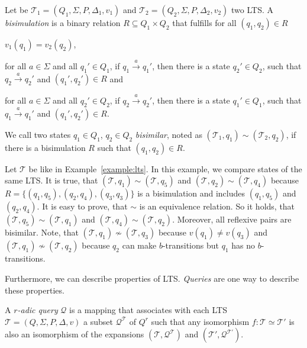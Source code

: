 \begin{definition}
    Let be $\mathcal{T}_1 = (Q_1, \Sigma, P, \Delta_1, v_1)$ and $\mathcal{T}_2 = (Q_2, \Sigma, P, \Delta_2, v_2)
    $ two LTS. A \emph{bisimulation} is a binary relation $R \subseteq Q_1 \times Q_2$ that fulfills for all $(q_1,
    q_2) \in R$
    \begin{compactitem}
        \item $v_1 (q_1) = v_2 (q_2)$,
        \item for all $a \in \Sigma$ and all $q_1' \in Q_1$, if $q_1 \overset{a}{\rightarrow} q_1'$, then there
        is a state $q_2' \in Q_2$, such that $q_2 \overset{a}{\rightarrow} q_2'$ and $(q_1', q_2') \in R$ and
        \item for all $a \in \Sigma$ and all $q_2' \in Q_2$, if $q_2 \overset{a}{\rightarrow} q_2'$, then there is a
        state $q_1' \in Q_1$, such that $q_1 \overset{a}{\rightarrow} q_1'$ and $(q_1', q_2') \in R$.
    \end{compactitem}
    We call two states $q_1 \in Q_1$, $q_2 \in Q_2$ \emph{bisimilar}, noted as $(\mathcal{T}_1, q_1) \sim
    (\mathcal{T}_2, q_2)$, if there
    is a bisimulation $R$ such that $(q_1, q_2) \in R$.
\end{definition}

\begin{example}
    \label{example:bisimilar}
    Let $\mathcal{T}$ be like in Example~\ref{example:lts}. In this example, we compare states of the same LTS. It is
    true, that $(\mathcal{T}, q_1) \sim (\mathcal{T}, q_5)$ and $(\mathcal{T}, q_2) \sim (\mathcal{T}, q_4)$ because
    $R = \{(q_1, q_5), (q_2, q_4), (q_3, q_3)\}$ is a bisimulation and includes $(q_1, q_5)$ and $(q_2, q_4)$. It is
    easy to prove, that $\sim$ is an equivalence relation. So it holds, that $(\mathcal{T}, q_5) \sim (\mathcal{T},
    q_1)$ and $(\mathcal{T}, q_4) \sim (\mathcal{T}, q_2)$. Moreover, all reflexive pairs are bisimilar. Note, that
    $(\mathcal{T}, q_1) \not\sim (\mathcal{T}, q_3)$ because $v(q_1) \neq v(q_3)$ and $(\mathcal{T}, q_1)
    \not\sim (\mathcal{T}, q_2)$ because $q_2$ can make $b$-transitions but $q_1$ has no $b$-transitions.
\end{example}

Furthermore, we can describe properties of LTS. \textit{Queries} are one way to describe these properties.

\begin{definition}{\cite{otto1999bisimulation}}
    \label{definition:query}
    A \emph{$r$-adic query} $\mathcal{Q}$ is a mapping that associates with each LTS $\mathcal{T} = (Q, \Sigma, P,
    \Delta, v)$ a subset $\mathcal{Q}^{\mathcal{T}}$ of $Q^r$ such that any isomorphism $f:
    \mathcal{T} \simeq \mathcal{T}'$ is also an isomorphism of the expansions $(\mathcal{T}, \mathcal{Q}^{\mathcal{T}})$
    and $({\mathcal{T}}', \mathcal{Q}^{{\mathcal{T}}'})$.
\end{definition}

